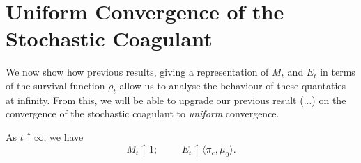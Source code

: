 \section{Uniform Convergence of the Stochastic Coagulant} We now show how previous results, giving a representation of $M_t$ and $E_t$ in terms of the survival function $\rho_t$ allow us to analyse the behaviour of these quantaties at infinity. From this, we will be able to upgrade our previous result (\textcolor{red}{...}) on the convergence of the stochastic coagulant to \emph{uniform} convergence. \begin{lemma}\label{lemma: M and E at infinity} As $t\uparrow \infty$, we have \begin{equation}
    M_t\uparrow 1; \hspace{1cm}E_t\uparrow \langle \pi_e, \mu_0\rangle.
\end{equation} \end{lemma}
